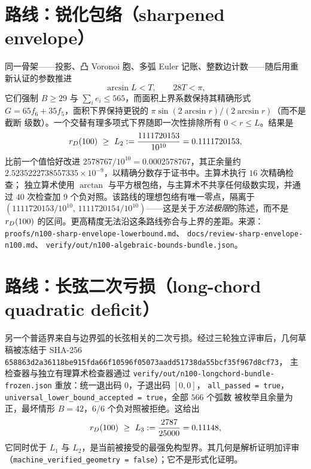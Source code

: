 \section{路线：锐化包络（sharpened envelope）}

同一骨架——投影、凸 Voronoi 胞、多弧 Euler 记账、整数边计数——随后用重新认证的参数推进
\[
\arcsin L<T,\qquad 28T<\pi,
\]
它们强制 $B\ge29$ 与 $\sum_ie_i\le565$，而面积上界系数保持其精确形式
$G=65f_6+35f_5$，面积下界保持更锐的 $\pi\sin(2\arcsin r)/(2\arcsin r)$（而不是截断
级数）。一个交替有理多项式下界随即一次性排除所有 $0<r\le L$。结果是
\[
\rD(100)\ \ge\ L_2:=\frac{1111720153}{10^{10}}=0.1111720153 ,
\]
比前一个值恰好改进 $2578767/10^{10}=0.0002578767$，其正余量约
$2.5235222738557335\times10^{-9}$，以精确分数存于证书中。主算术执行 $16$ 次精确检查；
独立算术使用 $\arctan$ 与平方根包络，与主算术不共享任何级数实现，并通过 $40$ 次检查加
$9$ 个负对照。该路线的理想包络有唯一零点，隔离于
$(1111720153/10^{10},\,1111720154/10^{10})$——这是关于\emph{方法极限}的陈述，而不是
$r_{D}(100)$ 的区间。更高精度无法沿这条路线弥合与上界的差距。来源：
\texttt{proofs/\allowbreak{}n100-\allowbreak{}sharp-\allowbreak{}envelope-\allowbreak{}lowerbound.md}、
\texttt{docs/\allowbreak{}review-\allowbreak{}sharp-\allowbreak{}envelope-\allowbreak{}n100.md}、
\texttt{verify/\allowbreak{}out/\allowbreak{}n100-\allowbreak{}algebraic-\allowbreak{}bounds-\allowbreak{}bundle.json}。

\section{路线：长弦二次亏损（long-chord quadratic deficit）}

另一个普适界来自与边界弧的长弦相关的二次亏损。经过三轮独立评审后，几何草稿被冻结于
SHA-256
{\footnotesize{\footnotesize\texttt{658863d2a36118be915fda66f10596f05073aadd51738da55bcf35f967d8cf73}}}，
主检查器与独立有理算术检查器通过
\texttt{verify/\allowbreak{}out/\allowbreak{}n100-\allowbreak{}longchord-\allowbreak{}bundle-\allowbreak{}frozen.json} 重放：统一退出码 $0$，子退出码 $[0,0]$，
\texttt{all\_\allowbreak{}passed = true}，\texttt{universal\_\allowbreak{}lower\_\allowbreak{}bound\_\allowbreak{}accepted = true}，全部 $566$ 个弧数
被枚举且余量为正，最坏情形 $B=42$，$6/6$ 个负对照被拒绝。这给出
\[
\rD(100)\ \ge\ L_3:=\frac{2787}{25000}=0.11148 ,
\]
它同时优于 $L_1$ 与 $L_2$，是当前被接受的最强免构型界。其几何是解析证明加评审
（\texttt{machine\_\allowbreak{}verified\_\allowbreak{}geometry = false}）；它不是形式化证明。

